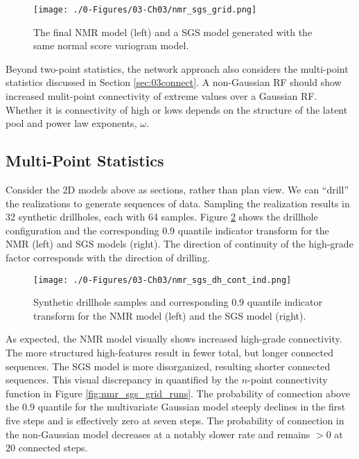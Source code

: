 \begin{figure}[htb!]
    \centering
    \texttt{[image: ./0-Figures/03-Ch03/nmr\_sgs\_grid.png]}
    \caption{ The final \gls{NMR} model (left) and a \gls{SGS} model generated with the same normal score variogram model. }
    \label{fig:nmr_sgs_grid}
\end{figure}

Beyond two-point statistics, the network approach also considers the multi-point statistics discussed in Section \ref{sec:03connect}. A non-Gaussian \gls{RF} should show increased mulit-point connectivity of extreme values over a Gaussian \gls{RF}. Whether it is connectivity of high or lows depends on the structure of the latent pool and power law exponents, $\omega$.


\FloatBarrier
\subsection{Multi-Point Statistics}
\label{subsec:03multipt}

Consider the \gls{2D} models above as sections, rather than plan view. We can ``drill'' the realizations to generate sequences of data. Sampling the realization results in 32 synthetic drillholes, each with 64 samples. Figure \ref{fig:nmr_sgs_dh_cont_ind} shows the drillhole configuration and the corresponding 0.9 quantile indicator transform for the \gls{NMR} (left) and \gls{SGS} models (right). The direction of continuity of the high-grade factor corresponds with the direction of drilling.

\begin{figure}[htb!]
    \centering
    \texttt{[image: ./0-Figures/03-Ch03/nmr\_sgs\_dh\_cont\_ind.png]}
    \caption{ Synthetic drillhole samples and corresponding 0.9 quantile indicator transform for the \gls{NMR} model (left) and the \gls{SGS} model (right).}
    \label{fig:nmr_sgs_dh_cont_ind}
\end{figure}

As expected, the \gls{NMR} model visually shows increased high-grade connectivity. The more structured high-features result in fewer total, but longer connected sequences. The \gls{SGS} model is more disorganized, resulting shorter connected sequences. This visual discrepancy in quantified by the $n$-point connectivity function in Figure \ref{fig:nmr_sgs_grid_runs}. The probability of connection above the 0.9 quantile for the multivariate Gaussian model steeply declines in the first five steps and is effectively zero at seven steps. The probability of connection in the non-Gaussian model decreases at a notably slower rate and remains $> 0$ at 20 connected steps.

